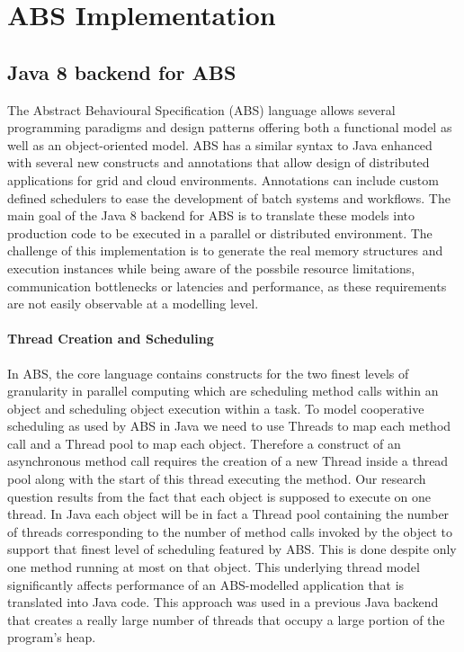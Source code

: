 \section{ABS Implementation}

\subsection{Java 8 backend for ABS}
The Abstract Behavioural Specification (ABS) language allows several programming paradigms and design patterns offering both a functional model as well as an object-oriented model. ABS has a similar syntax to Java enhanced with several new constructs and annotations that allow design of distributed applications for grid and cloud environments. Annotations can include custom defined schedulers to ease the development of batch systems and workflows. The main goal of the Java 8 backend for ABS is to translate these models into production code to be executed in a parallel or distributed environment. The challenge of this implementation is to generate the real memory structures and execution instances while being aware of the possbile resource limitations, communication bottlenecks or latencies and performance, as these requirements are not easily observable at a modelling level. 

\paragraph{Thread Creation and Scheduling}
In ABS, the core language contains constructs for the two finest levels of granularity in parallel computing which are scheduling method calls within an object and scheduling object execution within a task. To model cooperative scheduling as used by ABS in Java we need to use Threads to map each method call and a Thread pool to map each object. Therefore a construct of an asynchronous method call requires the creation of a new Thread inside a thread pool along with the start of this thread executing the method. Our research question results from the fact that each object is supposed to execute on one thread. In Java each object will be in fact a Thread pool containing the number of threads corresponding to the number of method calls invoked by the object to support that finest level of scheduling featured by ABS. This is done despite only one method running at most on that object. This underlying thread model significantly affects performance of an ABS-modelled application that is translated into Java code. This approach was used in a previous Java backend that creates a really large number of threads that occupy a large portion of the program's heap.

